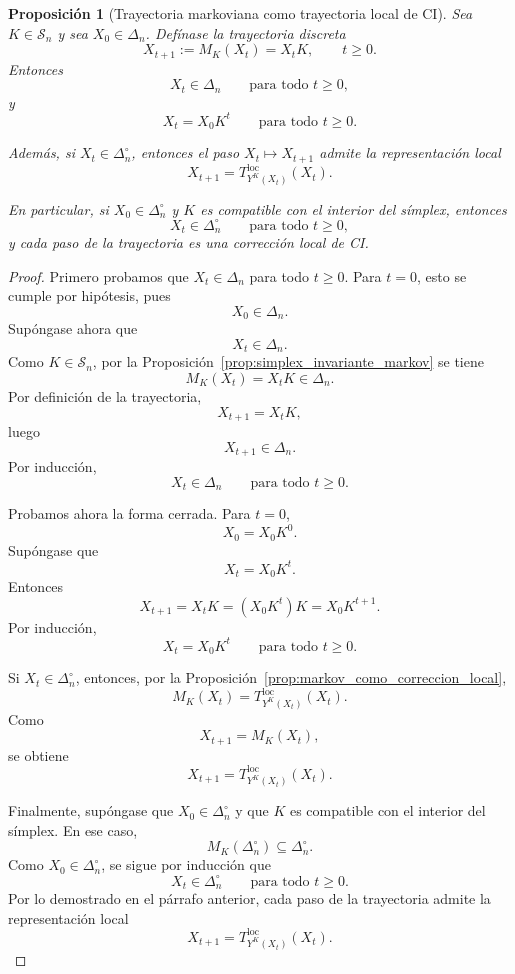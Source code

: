 \documentclass[12pt]{article}
\newtheorem{proposicion}{Proposición}[section]
\begin{document}
\begin{proposicion}[Trayectoria markoviana como trayectoria local de CI]\label{prop:trayectoria_markov_CI}
Sea \(K\in\mathcal S_n\) y sea \(X_0\in\Delta_n\). Defínase la trayectoria discreta
\[
X_{t+1}:=M_K(X_t)=X_tK,
\qquad t\ge 0.
\]
Entonces
\[
X_t\in\Delta_n
\qquad
\text{para todo }t\ge 0,
\]
y
\[
X_t=X_0K^t
\qquad
\text{para todo }t\ge 0.
\]

Además, si \(X_t\in\Delta_n^\circ\), entonces el paso \(X_t\mapsto X_{t+1}\) admite la representación local
\[
X_{t+1}
=
T^{\mathrm{loc}}_{Y^K(X_t)}(X_t).
\]

En particular, si \(X_0\in\Delta_n^\circ\) y \(K\) es compatible con el interior del símplex, entonces
\[
X_t\in\Delta_n^\circ
\qquad
\text{para todo }t\ge 0,
\]
y cada paso de la trayectoria es una corrección local de CI.
\end{proposicion}

\begin{proof}
Primero probamos que \(X_t\in\Delta_n\) para todo \(t\ge 0\). Para \(t=0\), esto se cumple por hipótesis, pues
\[
X_0\in\Delta_n.
\]
Supóngase ahora que
\[
X_t\in\Delta_n.
\]
Como \(K\in\mathcal S_n\), por la Proposición~\ref{prop:simplex_invariante_markov} se tiene
\[
M_K(X_t)=X_tK\in\Delta_n.
\]
Por definición de la trayectoria,
\[
X_{t+1}=X_tK,
\]
luego
\[
X_{t+1}\in\Delta_n.
\]
Por inducción,
\[
X_t\in\Delta_n
\qquad
\text{para todo }t\ge 0.
\]

Probamos ahora la forma cerrada. Para \(t=0\),
\[
X_0=X_0K^0.
\]
Supóngase que
\[
X_t=X_0K^t.
\]
Entonces
\[
X_{t+1}
=
X_tK
=
(X_0K^t)K
=
X_0K^{t+1}.
\]
Por inducción,
\[
X_t=X_0K^t
\qquad
\text{para todo }t\ge 0.
\]

Si \(X_t\in\Delta_n^\circ\), entonces, por la Proposición~\ref{prop:markov_como_correccion_local},
\[
M_K(X_t)
=
T^{\mathrm{loc}}_{Y^K(X_t)}(X_t).
\]
Como
\[
X_{t+1}=M_K(X_t),
\]
se obtiene
\[
X_{t+1}
=
T^{\mathrm{loc}}_{Y^K(X_t)}(X_t).
\]

Finalmente, supóngase que \(X_0\in\Delta_n^\circ\) y que \(K\) es compatible con el interior del símplex. En ese caso,
\[
M_K(\Delta_n^\circ)\subseteq\Delta_n^\circ.
\]
Como \(X_0\in\Delta_n^\circ\), se sigue por inducción que
\[
X_t\in\Delta_n^\circ
\qquad
\text{para todo }t\ge 0.
\]
Por lo demostrado en el párrafo anterior, cada paso de la trayectoria admite la representación local
\[
X_{t+1}
=
T^{\mathrm{loc}}_{Y^K(X_t)}(X_t).
\]
\end{proof}
\end{document}
